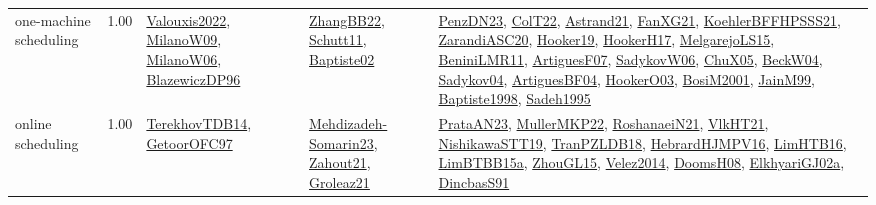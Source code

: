 {\begin{longtable}{p{3cm}r>{\raggedright\arraybackslash}p{6cm}>{\raggedright\arraybackslash}p{6cm}>{\raggedright\arraybackslash}p{8cm}}
\index{one-machine scheduling}\index{Concepts!one-machine scheduling}one-machine scheduling &  1.00 & \hyperref[detail:Valouxis2022]{Valouxis2022}, \hyperref[detail:MilanoW09]{MilanoW09}, \hyperref[detail:MilanoW06]{MilanoW06}, \hyperref[detail:BlazewiczDP96]{BlazewiczDP96} & \hyperref[detail:ZhangBB22]{ZhangBB22}, \hyperref[detail:Schutt11]{Schutt11}, \hyperref[detail:Baptiste02]{Baptiste02} & \hyperref[detail:PenzDN23]{PenzDN23}, \hyperref[detail:ColT22]{ColT22}, \hyperref[detail:Astrand21]{Astrand21}, \hyperref[detail:FanXG21]{FanXG21}, \hyperref[detail:KoehlerBFFHPSSS21]{KoehlerBFFHPSSS21}, \hyperref[detail:ZarandiASC20]{ZarandiASC20}, \hyperref[detail:Hooker19]{Hooker19}, \hyperref[detail:HookerH17]{HookerH17}, \hyperref[detail:MelgarejoLS15]{MelgarejoLS15}, \hyperref[detail:BeniniLMR11]{BeniniLMR11}, \hyperref[detail:ArtiguesF07]{ArtiguesF07}, \hyperref[detail:SadykovW06]{SadykovW06}, \hyperref[detail:ChuX05]{ChuX05}, \hyperref[detail:BeckW04]{BeckW04}, \hyperref[detail:Sadykov04]{Sadykov04}, \hyperref[detail:ArtiguesBF04]{ArtiguesBF04}, \hyperref[detail:HookerO03]{HookerO03}, \hyperref[detail:BosiM2001]{BosiM2001}, \hyperref[detail:JainM99]{JainM99}, \hyperref[detail:Baptiste1998]{Baptiste1998}, \hyperref[detail:Sadeh1995]{Sadeh1995}\\
\index{online scheduling}\index{Concepts!online scheduling}online scheduling &  1.00 & \hyperref[detail:TerekhovTDB14]{TerekhovTDB14}, \hyperref[detail:GetoorOFC97]{GetoorOFC97} & \hyperref[detail:Mehdizadeh-Somarin23]{Mehdizadeh-Somarin23}, \hyperref[detail:Zahout21]{Zahout21}, \hyperref[detail:Groleaz21]{Groleaz21} & \hyperref[detail:PrataAN23]{PrataAN23}, \hyperref[detail:MullerMKP22]{MullerMKP22}, \hyperref[detail:RoshanaeiN21]{RoshanaeiN21}, \hyperref[detail:VlkHT21]{VlkHT21}, \hyperref[detail:NishikawaSTT19]{NishikawaSTT19}, \hyperref[detail:TranPZLDB18]{TranPZLDB18}, \hyperref[detail:HebrardHJMPV16]{HebrardHJMPV16}, \hyperref[detail:LimHTB16]{LimHTB16}, \hyperref[detail:LimBTBB15a]{LimBTBB15a}, \hyperref[detail:ZhouGL15]{ZhouGL15}, \hyperref[detail:Velez2014]{Velez2014}, \hyperref[detail:DoomsH08]{DoomsH08}, \hyperref[detail:ElkhyariGJ02a]{ElkhyariGJ02a}, \hyperref[detail:DincbasS91]{DincbasS91}\\

\end{longtable}}
